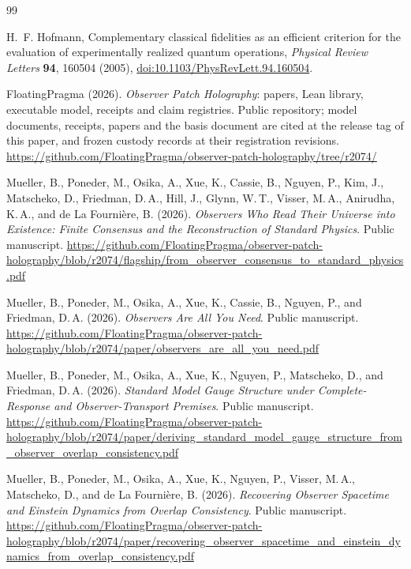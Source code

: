 \documentclass[11pt]{article}
\theoremstyle{definition}
\theoremstyle{remark}
\theoremstyle{plain}
\begin{document}
{\footnotesize
\begin{thebibliography}{99}

H.~F. Hofmann, Complementary classical fidelities as an efficient criterion
for the evaluation of experimentally realized quantum operations,
\emph{Physical Review Letters} \textbf{94}, 160504 (2005),
\href{https://doi.org/10.1103/PhysRevLett.94.160504}{doi:10.1103/PhysRevLett.94.160504}.

\setlength{\itemsep}{0pt}\setlength{\parsep}{0pt}

FloatingPragma (2026). \emph{Observer Patch Holography}: papers, Lean library,
executable model, receipts and claim registries. Public repository; model
documents, receipts, papers and the basis document are cited at the release
tag of this paper, and frozen custody records at their registration
revisions.
\url{https://github.com/FloatingPragma/observer-patch-holography/tree/r2074/}

Mueller, B., Poneder, M., Osika, A., Xue, K., Cassie, B., Nguyen, P., Kim, J.,
Matscheko, D., Friedman, D.\,A., Hill, J., Glynn, W.\,T., Visser, M.\,A., Anirudha, K.\,A., and de La Fourni\`ere, B. (2026). \emph{Observers Who Read Their Universe into Existence: Finite Consensus and the Reconstruction of Standard Physics}. Public manuscript.
\url{https://github.com/FloatingPragma/observer-patch-holography/blob/r2074/flagship/from_observer_consensus_to_standard_physics.pdf}

Mueller, B., Poneder, M., Osika, A., Xue, K., Cassie, B., Nguyen, P., and Friedman, D.\,A.
(2026). \emph{Observers Are All You Need}. Public manuscript.
\url{https://github.com/FloatingPragma/observer-patch-holography/blob/r2074/paper/observers_are_all_you_need.pdf}

Mueller, B., Poneder, M., Osika, A., Xue, K., Nguyen, P., Matscheko, D., and Friedman, D.\,A.
(2026). \emph{Standard Model Gauge Structure under Complete-Response and Observer-Transport Premises}. Public manuscript.
\url{https://github.com/FloatingPragma/observer-patch-holography/blob/r2074/paper/deriving_standard_model_gauge_structure_from_observer_overlap_consistency.pdf}

Mueller, B., Poneder, M., Osika, A., Xue, K., Nguyen, P., Visser, M.\,A.,
Matscheko, D., and de La Fourni\`ere, B. (2026). \emph{Recovering Observer
Spacetime and Einstein Dynamics from Overlap Consistency}. Public manuscript.
\url{https://github.com/FloatingPragma/observer-patch-holography/blob/r2074/paper/recovering_observer_spacetime_and_einstein_dynamics_from_overlap_consistency.pdf}


\end{thebibliography}}
\end{document}

